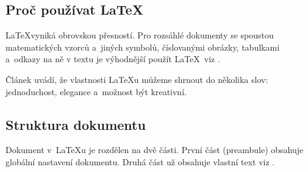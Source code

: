 \documentclass[a4paper, 11pt]{article}
\begin{document}
	\subsection{Proč používat \LaTeX}
	\LaTeX vyniká obrovskou přesností. Pro rozsáhlé dokumenty se spoustou matematických vzorců a~jiných symbolů,
	číslovanými obrázky, tabulkami a~odkazy na ně v textu je výhodnější použít \LaTeX\ viz \cite{Martinek2010}.

	Článek \cite{Simecek2013} uvádí, že vlastnosti {\LaTeX}u můžeme shrnout do několika slov: jednoduchost,
	elegance a~možnost být kreativní.

	\subsection{Struktura dokumentu}
	Dokument v~{\LaTeX}u je rozdělen na dvě části. První část (preambule) obsahuje globální nastavení dokumentu.
	Druhá část už obsahuje vlastní text viz \cite{Svamberg2001}.

	\newpage
	
	\renewcommand{\refname}{Literatura}
	
\end{document}
